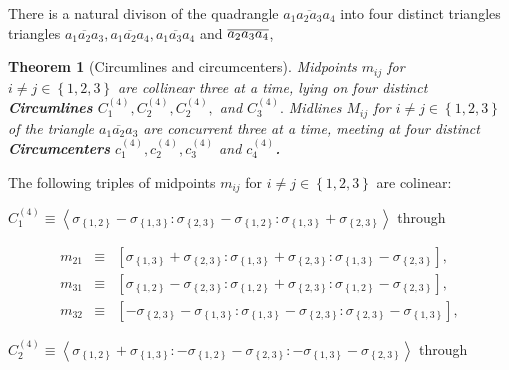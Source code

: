 \documentclass[11pt]{article}
\newtheorem{theorem}{Theorem}
\begin{document}
There is a natural divison of the quadrangle $\overline{a_{1}a_{2}a_{3}a_{4}}
$ into four distinct triangles triangles $\overline{a_{1}a_{2}a_{3}},%
\overline{a_{1}a_{2}a_{4}},\overline{a_{1}a_{3}a_{4}}$ and $\overline{%
a_{2}a_{3}a_{4}}$,

\begin{theorem}[Circumlines and circumcenters]
Midpoints $m_{ij}$ for $i\neq j\in \left\{ 1,2,3\right\} $ are collinear
three at a time, lying on four distinct \textbf{Circumlines} $C_{1}^{\left(
4\right) },C_{2}^{\left( 4\right) },C_{2}^{\left( 4\right) },$ and $%
C_{3}^{\left( 4\right) }.$ Midlines $M_{ij}$ for $i\neq j\in \left\{
1,2,3\right\} $ of the triangle $\overline{a_{1}a_{2}a_{3}}$ are concurrent
three at a time, meeting at four distinct \textbf{Circumcenters} $%
c_{1}^{\left( 4\right) },c_{2}^{\left( 4\right) },c_{3}^{\left( 4\right) }$
and $c_{4}^{\left( 4\right) }$\textbf{.}
\end{theorem}

The following triples of midpoints $m_{ij}$ for $i\neq j\in \left\{
1,2,3\right\} $ are colinear:

$C_{1}^{\left( 4\right) }\equiv \left\langle \sigma _{\left\{ 1,2\right\}
}-\sigma _{\left\{ 1,3\right\} }:\sigma _{\left\{ 2,3\right\} }-\sigma
_{\left\{ 1,2\right\} }:\sigma _{\left\{ 1,3\right\} }+\sigma _{\left\{
2,3\right\} }\right\rangle $ through

\begin{eqnarray*}
m_{21} &\equiv &\left[ \sigma _{\left\{ 1,3\right\} }+\sigma _{\left\{
2,3\right\} }:\sigma _{\left\{ 1,3\right\} }+\sigma _{\left\{ 2,3\right\}
}:\sigma _{\left\{ 1,3\right\} }-\sigma _{\left\{ 2,3\right\} }\right] , \\
m_{31} &\equiv &\left[ \sigma _{\left\{ 1,2\right\} }-\sigma _{\left\{
2,3\right\} }:\sigma _{\left\{ 1,2\right\} }+\sigma _{\left\{ 2,3\right\}
}:\sigma _{\left\{ 1,2\right\} }-\sigma _{\left\{ 2,3\right\} }\right] , \\
m_{32} &\equiv &\left[ -\sigma _{\left\{ 2,3\right\} }-\sigma _{\left\{
1,3\right\} }:\sigma _{\left\{ 1,3\right\} }-\sigma _{\left\{ 2,3\right\}
}:\sigma _{\left\{ 2,3\right\} }-\sigma _{\left\{ 1,3\right\} }\right] ,
\end{eqnarray*}

$C_{2}^{\left( 4\right) }\equiv \left\langle \sigma _{\left\{ 1,2\right\}
}+\sigma _{\left\{ 1,3\right\} }:-\sigma _{\left\{ 1,2\right\} }-\sigma
_{\left\{ 2,3\right\} }:-\sigma _{\left\{ 1,3\right\} }-\sigma _{\left\{
2,3\right\} }\right\rangle $ through
\end{document}
